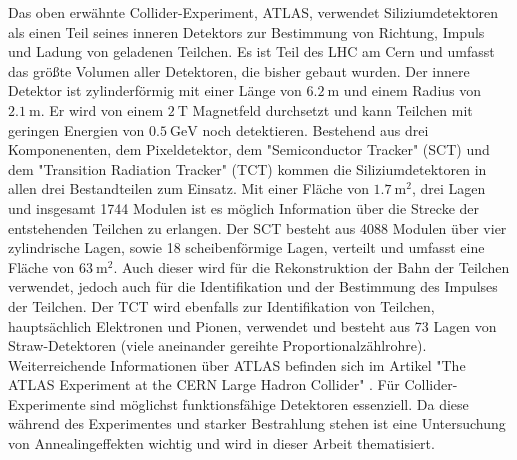 Das oben erwähnte Collider-Experiment, ATLAS, verwendet Siliziumdetektoren als
einen Teil seines inneren Detektors zur Bestimmung von Richtung, Impuls
und Ladung von geladenen Teilchen. Es ist Teil des LHC am Cern und umfasst
das größte Volumen aller Detektoren, die bisher gebaut wurden\cite{atlas}.
Der innere Detektor ist zylinderförmig mit einer Länge von $\SI{6.2}{\meter}$ und
einem Radius von $\SI{2.1}{\meter}$. Er wird von einem $\SI{2}{\tesla}$ Magnetfeld
durchsetzt und kann Teilchen mit geringen Energien von $\SI{0.5}{\giga\eV}$ noch detektieren.
Bestehend aus drei Komponenenten, dem Pixeldetektor, dem "Semiconductor Tracker" (SCT) und dem "Transition Radiation Tracker" (TCT) kommen  die
Siliziumdetektoren in allen drei Bestandteilen zum Einsatz.
Mit einer Fläche von $\SI{1.7}{\meter\squared}$, drei Lagen und insgesamt 1744 Modulen ist es möglich
Information über die Strecke der entstehenden Teilchen zu erlangen. Der SCT besteht aus 4088 Modulen über vier zylindrische Lagen,
sowie 18 scheibenförmige Lagen, verteilt und umfasst eine Fläche von $\SI{63}{\meter\squared}$. Auch dieser wird für
die Rekonstruktion der Bahn der Teilchen verwendet, jedoch auch für die Identifikation und der Bestimmung des Impulses der Teilchen.
Der TCT wird ebenfalls zur Identifikation von Teilchen, hauptsächlich Elektronen und Pionen, verwendet und besteht aus 73 Lagen
von Straw-Detektoren (viele aneinander gereihte Proportionalzählrohre).
Weiterreichende Informationen über ATLAS befinden sich im Artikel "The ATLAS Experiment at the CERN Large
Hadron Collider" \cite{ATLAS}.
Für Collider-Experimente sind möglichst funktionsfähige Detektoren essenziell. Da diese während des Experimentes und starker Bestrahlung
stehen ist eine Untersuchung von Annealingeffekten wichtig und wird in dieser Arbeit thematisiert.
